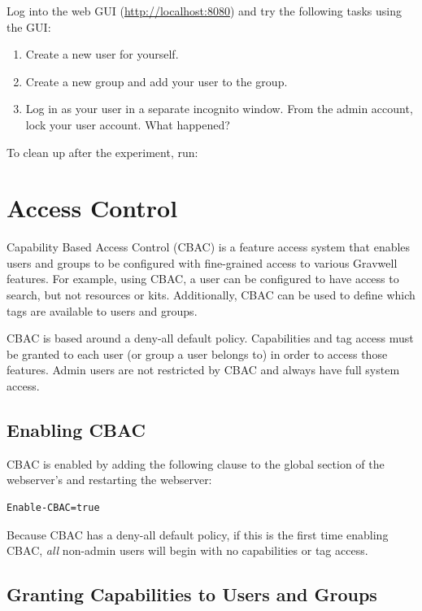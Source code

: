 Log into the web GUI (\href{http://localhost:8080}{http://localhost:8080}) and try the following tasks using the GUI:

\begin{enumerate}
\item
  Create a new user for yourself.
\item
  Create a new group and add your user to the group.
\item
  Log in as your user in a separate incognito window. From the admin
  account, lock your user account. What happened?
\end{enumerate}

To clean up after the experiment, run:


\clearpage
\section{Access Control}

Capability Based Access Control (CBAC) is a feature access system that enables users and groups to be configured with fine-grained access to various Gravwell features. For example, using CBAC, a user can be configured to have access to search, but not resources or kits. Additionally, CBAC can be used to define which tags are available to users and groups.

CBAC is based around a deny-all default policy. Capabilities and tag access must be granted to each user (or group a user belongs to) in order to access those features. Admin users are not restricted by CBAC and always have full system access.

\subsection{Enabling CBAC}

CBAC is enabled by adding the following clause to the global section of the webserver's  and restarting the webserver:

\begin{verbatim}
Enable-CBAC=true
\end{verbatim}

Because CBAC has a deny-all default policy, if this is the first time enabling CBAC, \emph{all} non-admin users will begin with no capabilities or tag access. 

\subsection{Granting Capabilities to Users and Groups}

